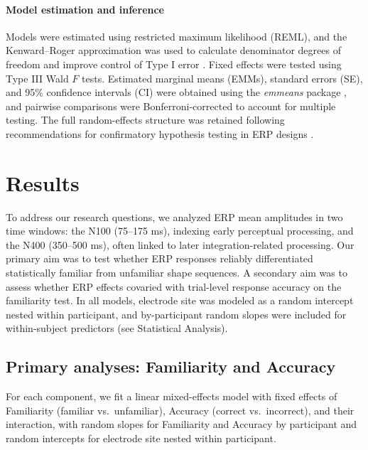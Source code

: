 \paragraph{Model estimation and inference}
Models were estimated using restricted maximum likelihood (REML), and the Kenward--Roger approximation was used to calculate denominator degrees of freedom and improve control of Type I error \cite{kenwardSmallSampleInference1997}. Fixed effects were tested using Type III Wald $F$ tests. Estimated marginal means (EMMs), standard errors (SE), and 95\% confidence intervals (CI) were obtained using the \textit{emmeans} package \cite{lenthEmmeansEstimatedMarginal2024}, and pairwise comparisons were Bonferroni-corrected to account for multiple testing. The full random-effects structure was retained following recommendations for confirmatory hypothesis testing in ERP designs \cite{barrRandomEffectsStructure2013}.



\section*{Results}

To address our research questions, we analyzed ERP mean amplitudes in two time windows: the N100 (75--175 ms), indexing early perceptual processing, and the N400 (350--500 ms), often linked to later integration-related processing. Our primary aim was to test whether ERP responses reliably differentiated statistically familiar from unfamiliar shape sequences. A secondary aim was to assess whether ERP effects covaried with trial-level response accuracy on the familiarity test. In all models, electrode site was modeled as a random intercept nested within participant, and by-participant random slopes were included for within-subject predictors (see Statistical Analysis).

\subsection*{Primary analyses: Familiarity and Accuracy}

For each component, we fit a linear mixed-effects model with fixed effects of Familiarity (familiar vs.\ unfamiliar), Accuracy (correct vs.\ incorrect), and their interaction, with random slopes for Familiarity and Accuracy by participant and random intercepts for electrode site nested within participant.

